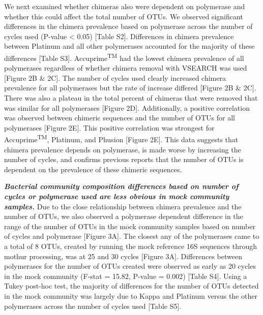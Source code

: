 \documentclass[11pt,]{article}
\begin{document}
We next examined whether chimeras also were dependent on polymerase and
whether this could affect the total number of OTUs. We observed
significant differences in the chimera prevalence based on polymerase
across the number of cycles used (P-value \textless{} 0.05) {[}Table
S2{]}. Differences in chimera prevalence between Platinum and all other
polymerases accounted for the majority of these differences {[}Table
S3{]}. Accuprime\textsuperscript{TM} had the lowest chimera prevalence
of all polymerases regardless of whether chimera removal with VSEARCH
was used {[}Figure 2B \& 2C{]}. The number of cycles used clearly
increased chimera prevalence for all polymerases but the rate of
increase differed {[}Figure 2B \& 2C{]}. There was also a plateau in the
total percent of chimeras that were removed that was similar for all
polymerases {[}Figure 2D{]}. Additionally, a positive correlation was
observed between chimeric sequences and the number of OTUs for all
polymerases {[}Figure 2E{]}. This positive correlation was strongest for
Accuprime\textsuperscript{TM}, Platinum, and Phusion {[}Figure 2E{]}.
This data suggests that chimera prevalence depends on polymerase, is
made worse by increasing the number of cycles, and confirms previous
reports that the number of OTUs is dependent on the prevalence of these
chimeric sequences.

\textbf{\emph{Bacterial community composition differences based on
number of cycles or polymerase used are less obvious in mock community
samples.}} Due to the close relationship between chimera prevalence and
the number of OTUs, we also observed a polymerase dependent difference
in the range of the number of OTUs in the mock community samples based
on number of cycles and polymerase {[}Figure 3A{]}. The closest any of
the polymerases came to a total of 8 OTUs, created by running the mock
reference 16S sequences through mothur processing, was at 25 and 30
cycles {[}Figure 3A{]}. Differences between polymerases for the number
of OTUs created were observed as early as 20 cycles in the mock
community (F-stat = 15.82, P-value = 0.002) {[}Table S4{]}. Using a
Tukey post-hoc test, the majority of differences for the number of OTUs
detected in the mock community was largely due to Kappa and Platinum
versus the other polymerases across the number of cycles used {[}Table
S5{]}.
\end{document}

